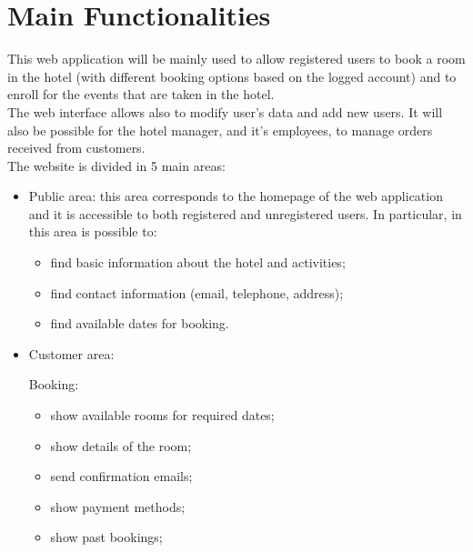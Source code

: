 \section{Main Functionalities}
This web application will be mainly used to allow registered users to book a room in the hotel (with different booking options based on the logged account) and to enroll for the events that are taken in the hotel.\\ 
The web interface allows also to modify user's data and add new users. It will also be possible for the hotel manager, and it's employees, to manage orders received from customers.\\

The website is divided in 5 main areas:
\begin{itemize}
    \item  Public area: this area corresponds to the homepage of the web application and it is accessible to both registered and unregistered users. In particular, in this area is possible to:
    \begin{itemize}
        \item find basic information about the hotel and activities;
        \item find contact information (email, telephone, address);
        \item find available dates for booking.     
    \end{itemize}

    \item Customer area:
    
    Booking:
    \begin{itemize}
    
        \item show available rooms for required dates;
        \item show details of the room;
        \item send confirmation emails;
        \item show payment methods;
        \item show past bookings;
    \end{itemize}


\end{itemize}
